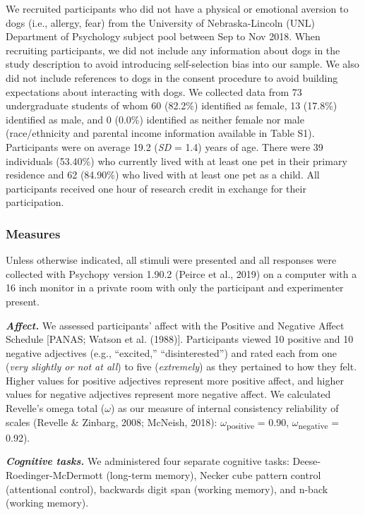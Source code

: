 \documentclass[
  english,
  pub,floatsintext]{apa6}
\begin{document}
We recruited participants who did not have a physical or emotional aversion to dogs (i.e., allergy, fear) from the University of Nebraska-Lincoln (UNL) Department of Psychology subject pool between Sep to Nov 2018. When recruiting participants, we did not include any information about dogs in the study description to avoid introducing self-selection bias into our sample. We also did not include references to dogs in the consent procedure to avoid building expectations about interacting with dogs. We collected data from 73 undergraduate students of whom 60 (82.2\%) identified as female, 13 (17.8\%) identified as male, and 0 (0.0\%) identified as neither female nor male (race/ethnicity and parental income information available in Table S1). Participants were on average 19.2 (\emph{SD} = 1.4) years of age. There were 39 individuals (53.40\%) who currently lived with at least one pet in their primary residence and 62 (84.90\%) who lived with at least one pet as a child. All participants received one hour of research credit in exchange for their participation.

\hypertarget{measures}{%
\subsubsection{Measures}\label{measures}}

Unless otherwise indicated, all stimuli were presented and all responses were collected with Psychopy version 1.90.2 (Peirce et al., 2019) on a computer with a 16 inch monitor in a private room with only the participant and experimenter present.

\textbf{\emph{Affect.}}
We assessed participants' affect with the Positive and Negative Affect Schedule {[}PANAS; Watson et al. (1988){]}. Participants viewed 10 positive and 10 negative adjectives (e.g., ``excited,'' ``disinterested'') and rated each from one (\emph{very slightly or not at all}) to five (\emph{extremely}) as they pertained to how they felt. Higher values for positive adjectives represent more positive affect, and higher values for negative adjectives represent more negative affect. We calculated Revelle's omega total (\(\omega\)) as our measure of internal consistency reliability of scales (Revelle \& Zinbarg, 2008; McNeish, 2018): \(\omega\)\textsubscript{positive} = 0.90, \(\omega\)\textsubscript{negative} = 0.92).

\textbf{\emph{Cognitive tasks.}}
We administered four separate cognitive tasks: Deese-Roedinger-McDermott (long-term memory), Necker cube pattern control (attentional control), backwards digit span (working memory), and n-back (working memory).
\end{document}

